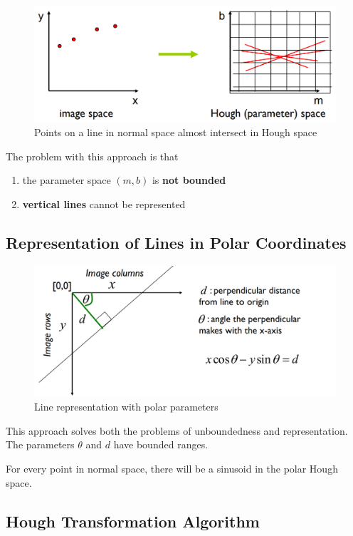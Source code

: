\begin{figure}[H]
	\centering
	\includegraphics[width=0.7\linewidth]{img/points_representation_hough}
	\caption{Points on a line in normal space almost intersect in Hough space}
	\label{fig:pointsrepresentationhough}
\end{figure}

The problem with this approach is that
\begin{enumerate}[label=\alph*.]
	\item the parameter space $(m,b)$ is \textbf{not bounded}
	\item \textbf{vertical lines} cannot be represented
\end{enumerate}

\subsection{Representation of Lines in Polar Coordinates}

\begin{figure}[H]
	\centering
	\includegraphics[width=0.7\linewidth]{img/line_representation_polar}
	\caption{Line representation with polar parameters}
	\label{fig:linerepresentationpolar}
\end{figure}

This approach solves both the problems of unboundedness and representation. The parameters $\theta$ and $d$ have bounded ranges.

For every point in normal space, there will be a sinusoid in the polar Hough space.

\subsection{Hough Transformation Algorithm}

